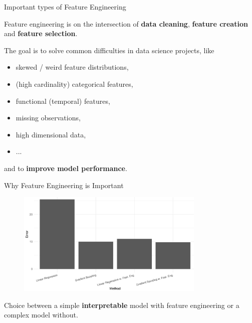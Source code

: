 \begin{vbframe}{Important types of Feature Engineering}
    
    Feature engineering is on the intersection of \textbf{data cleaning}, \textbf{feature creation} and \textbf{feature selection}.
    \medskip
    
    The goal is to solve common difficulties in data science projects, like
    
    \begin{itemize}
        \item skewed / weird feature distributions,
        \item (high cardinality) categorical features,
        \item functional (temporal) features,
        \item missing observations,
        \item high dimensional data,
        \item ...
    \end{itemize}
    
    and to \textbf{improve model performance}.
\end{vbframe}

\begin{vbframe}{Why Feature Engineering is Important}
    
    \begin{figure}
        \includegraphics[width =0.8\textwidth]{figure_man/feature-engineering.png}
    \end{figure}
    
    Choice between a simple \textbf{interpretable} model with feature engineering or a complex model without.
\end{vbframe}

